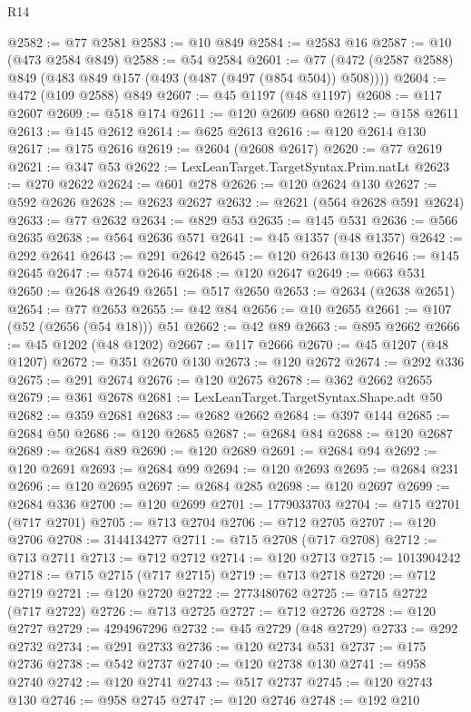 \begin{lexlean}{R14}
\begin{coremodule}
{{{{{{{{{{{{{{{{{{{{{{{{{{{{{{{{{{{{{{{{{{{{{{{{{{{{{{{{{{{{{{{{{{{{{{{{{{{{{{{{{{{{{{{{{{{{{{{{{{{{{{{{{{@2582 := @77 @2581
@2583 := @10 @849
@2584 := @2583 @16
@2587 := @10 (@473 @2584 @849)
@2588 := @54 @2584
@2601 := @77 (@472 (@2587 @2588) @849 (@483 @849 @157 (@493 (@487 (@497 (@854 @504)) @508))))
@2604 := @472 (@109 @2588) @849
@2607 := @45 @1197 (@48 @1197)
@2608 := @117 @2607
@2609 := @518 @174
@2611 := @120 @2609 @680
@2612 := @158 @2611
@2613 := @145 @2612
@2614 := @625 @2613
@2616 := @120 @2614 @130
@2617 := @175 @2616
@2619 := @2604 (@2608 @2617)
@2620 := @77 @2619
@2621 := @347 @53
@2622 := LexLeanTarget.TargetSyntax.Prim.natLt
@2623 := @270 @2622
@2624 := @601 @278
@2626 := @120 @2624 @130
@2627 := @592 @2626
@2628 := @2623 @2627
@2632 := @2621 (@564 @2628 @591 @2624)
@2633 := @77 @2632
@2634 := @829 @53
@2635 := @145 @531
@2636 := @566 @2635
@2638 := @564 @2636 @571
@2641 := @45 @1357 (@48 @1357)
@2642 := @292 @2641
@2643 := @291 @2642
@2645 := @120 @2643 @130
@2646 := @145 @2645
@2647 := @574 @2646
@2648 := @120 @2647
@2649 := @663 @531
@2650 := @2648 @2649
@2651 := @517 @2650
@2653 := @2634 (@2638 @2651)
@2654 := @77 @2653
@2655 := @42 @84
@2656 := @10 @2655
@2661 := @107 (@52 (@2656 (@54 @18))) @51
@2662 := @42 @89
@2663 := @895 @2662
@2666 := @45 @1202 (@48 @1202)
@2667 := @117 @2666
@2670 := @45 @1207 (@48 @1207)
@2672 := @351 @2670 @130
@2673 := @120 @2672
@2674 := @292 @336
@2675 := @291 @2674
@2676 := @120 @2675
@2678 := @362 @2662 @2655
@2679 := @361 @2678
@2681 := LexLeanTarget.TargetSyntax.Shape.adt @50
@2682 := @359 @2681
@2683 := @2682 @2662
@2684 := @397 @144
@2685 := @2684 @50
@2686 := @120 @2685
@2687 := @2684 @84
@2688 := @120 @2687
@2689 := @2684 @89
@2690 := @120 @2689
@2691 := @2684 @94
@2692 := @120 @2691
@2693 := @2684 @99
@2694 := @120 @2693
@2695 := @2684 @231
@2696 := @120 @2695
@2697 := @2684 @285
@2698 := @120 @2697
@2699 := @2684 @336
@2700 := @120 @2699
@2701 := 1779033703
@2704 := @715 @2701 (@717 @2701)
@2705 := @713 @2704
@2706 := @712 @2705
@2707 := @120 @2706
@2708 := 3144134277
@2711 := @715 @2708 (@717 @2708)
@2712 := @713 @2711
@2713 := @712 @2712
@2714 := @120 @2713
@2715 := 1013904242
@2718 := @715 @2715 (@717 @2715)
@2719 := @713 @2718
@2720 := @712 @2719
@2721 := @120 @2720
@2722 := 2773480762
@2725 := @715 @2722 (@717 @2722)
@2726 := @713 @2725
@2727 := @712 @2726
@2728 := @120 @2727
@2729 := 4294967296
@2732 := @45 @2729 (@48 @2729)
@2733 := @292 @2732
@2734 := @291 @2733
@2736 := @120 @2734 @531
@2737 := @175 @2736
@2738 := @542 @2737
@2740 := @120 @2738 @130
@2741 := @958 @2740
@2742 := @120 @2741
@2743 := @517 @2737
@2745 := @120 @2743 @130
@2746 := @958 @2745
@2747 := @120 @2746
@2748 := @192 @210
}}}}}}}}}}}}}}}}}}}}}}}}}}}}}}}}}}}}}}}}}}}}}}}}}}}}}}}}}}}}}}}}}}}}}}}}}}}}}}}}}}}}}}}}}}}}}}}}}}}}}}}}}}
\end{coremodule}
\end{lexlean}

